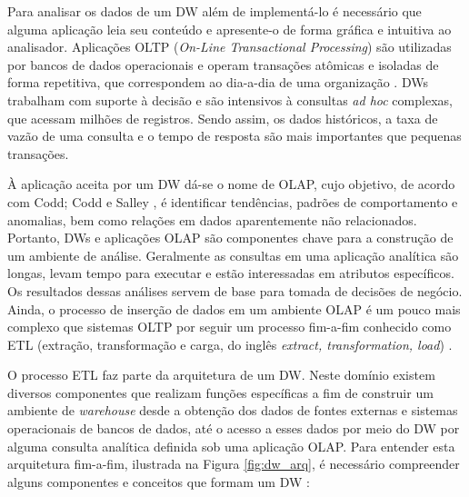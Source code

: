 Para analisar os dados de um DW além de implementá-lo é necessário que alguma aplicação leia seu conteúdo e apresente-o de forma gráfica e intuitiva ao analisador. Aplicações OLTP (\textit{On-Line Transactional Processing}) são utilizadas por bancos de dados operacionais e operam transações atômicas e isoladas de forma repetitiva, que correspondem ao dia-a-dia de uma organização \cite{chaudhuri1997overview}. DWs trabalham com suporte à decisão e são intensivos à consultas \textit{ad hoc} complexas, que acessam milhões de registros. Sendo assim, os dados históricos, a taxa de vazão de uma consulta e o tempo de resposta são mais importantes que pequenas transações.

À aplicação aceita por um DW dá-se o nome de OLAP, cujo objetivo, de acordo com Codd; Codd e Salley \cite{codd1998providing}, é identificar tendências, padrões de comportamento e anomalias, bem como relações em dados aparentemente não relacionados. Portanto, DWs e aplicações OLAP são componentes chave para a construção de um ambiente de análise.
Geralmente as consultas em uma aplicação analítica são longas, levam tempo para executar e estão interessadas 
em atributos específicos. Os resultados dessas análises servem de base para tomada de decisões de negócio. Ainda, o processo de inserção de dados em um ambiente OLAP é um pouco mais complexo que sistemas OLTP por seguir um processo fim-a-fim conhecido 
como ETL (extração, transformação e carga, do inglês \textit{extract, transformation, load}) \cite{vertabelo2017olap}. 

O processo ETL faz parte da arquitetura de um DW. Neste domínio existem diversos componentes que realizam funções específicas a fim de construir um ambiente de \textit{warehouse} desde a obtenção dos dados de fontes externas e sistemas operacionais de bancos de dados, até o acesso a esses dados por meio do DW por alguma consulta analítica definida sob uma aplicação OLAP. Para entender esta arquitetura fim-a-fim, ilustrada na Figura \ref{fig:dw_arq}, é necessário compreender alguns componentes e conceitos que formam um DW \cite{kimball2002dw}:

